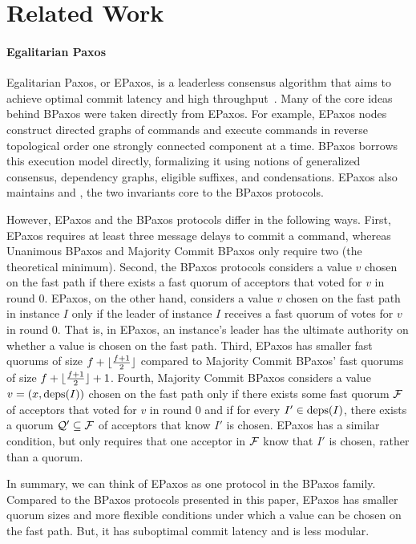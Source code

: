 \section{Related Work}

\paragraph{Egalitarian Paxos}
Egalitarian Paxos, or EPaxos, is a leaderless consensus algorithm that aims to
achieve optimal commit latency and high throughput~\cite{moraru2013there,
moraru2013proof}. Many of the core ideas behind BPaxos were taken directly from
EPaxos. For example, EPaxos nodes construct directed graphs of commands and execute commands in reverse topological order one
strongly connected component at a time. BPaxos borrows this execution model
directly, formalizing it using notions of generalized consensus, dependency
graphs, eligible suffixes, and condensations.  EPaxos also maintains
 and , the two invariants
core to the BPaxos protocols.

However, EPaxos and the BPaxos protocols differ in the following ways.
%
First, EPaxos requires at least three message delays to commit a command,
whereas Unanimous BPaxos and Majority Commit BPaxos only require two (the
theoretical minimum).
%
Second, the BPaxos protocols considers a value $v$ chosen on the fast path
if there exists a fast quorum of acceptors that voted for $v$ in round $0$.
EPaxos, on the other hand, considers a value $v$ chosen on the fast path in
instance $I$ only if the leader of instance $I$ receives a fast quorum of votes
for $v$ in round $0$.  That is, in EPaxos, an instance's leader has the
ultimate authority on whether a value is chosen on the fast path.
%
Third, EPaxos has smaller fast quorums of size $f + \lfloor\frac{f+1}{2}\rfloor$
compared to Majority Commit BPaxos' fast quorums of size $f + \lfloor\frac{f + 1}{2}\rfloor + 1$.
%
Fourth, Majority Commit BPaxos considers a value $v = (x, \text{deps}(I))$ chosen on
the fast path only if there exists some fast quorum $\mathcal{F}$ of acceptors
that voted for $v$ in round $0$ and if for every $I' \in \text{deps}(I)$, there
exists a quorum $\mathcal{Q}' \subseteq \mathcal{F}$ of acceptors that know $I'$ is
chosen. EPaxos has a similar condition, but only requires that one acceptor in
$\mathcal{F}$ know that $I'$ is chosen, rather than a quorum.

In summary, we can think of EPaxos as one protocol in the BPaxos family.
Compared to the BPaxos protocols presented in this paper, EPaxos has smaller
quorum sizes and more flexible conditions under which a value can be chosen on
the fast path. But, it has suboptimal commit latency and is less modular.

